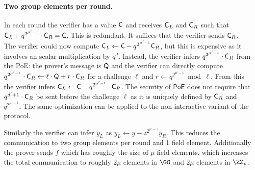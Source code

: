 
\paragraph{Two group elements per round.} In each round the verifier has a value $\gr{C}$ and receives $\gr{C}_L$ and $\gr{C}_R$ such that $\gr{C}_L+q^{2^{\mu'-1}}\cdot \gr{C}_R=\gr{C}$. This is redundant. It suffices that the verifier sends $\gr{C}_R$. The verifier could now compute $\gr{C}_L\gets \gr{C} -q^{2^{\mu'-1}} \gr{C}_R$, but this is expensive as it involves an scalar multiplication by $q^d$. Instead, the verifier infers $q^{2^{\mu'-1}}\cdot \gr{C}_R$ from the \textsf{PoE}: the prover's message is $\gr{Q}$ and the verifier can directly compute $q^{2^{\mu'-1}}\cdot \gr{C}_R\gets \ell \cdot \gr{Q}+r\cdot \gr{C}_R$ for a challenge $\ell$ and $r\gets q^{2^{\mu'-1}} \bmod \ell$. From this the verifier infers $\gr{C}_L \gets \gr{C}-q^{2^{\mu'-1}} \cdot \gr{C}_R$. The security of $\textsf{PoE}$ does not require that $q^{d'+1}\cdot \gr{C}_R$ be sent before the challenge $\ell$ as it is uniquely defined by $\gr{C}_R$ and $q^{2^{\mu'-1}}$.
The same optimization can be applied to the non-interactive variant of the protocol. 

Similarly the verifier can infer $y_L$ as $y_L\gets y-z^{2^{\mu'-1}} y_R$. This reduces the communication to two group elements per round and 1 field element. Additionally the prover sends $f$ which has roughly the size of $\mu$ field elements, which increases the total communication to roughly $2\mu$ elements in $\GG$ and $2\mu$ elements in $\ZZ_p$. 

